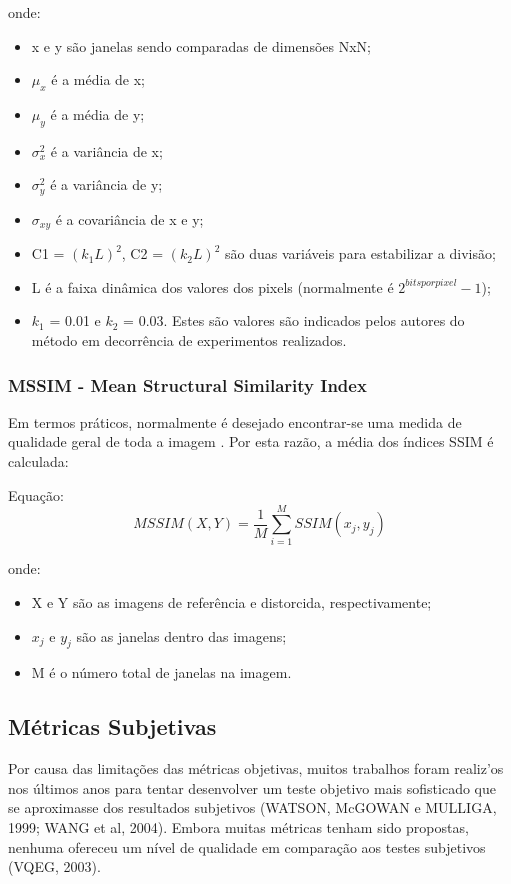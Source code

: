 onde:
\begin{itemize}
	\item x e y são janelas sendo comparadas de dimensões NxN;
	\item \(\mu_{x}\) é a média de x;
    \item \(\mu_{y}\) é  a média de y;
    \item \(\sigma^{2}_{x}\) é a variância de x;
    \item \(\sigma^{2}_{y}\) é a variância de y;
    \item \(\sigma_{xy}\) é a covariância de x e y;
    \item C1 = \((k_{1}L)^{2}\), C2 = \((k_{2}L)^{2}\) são duas variáveis para estabilizar a divisão;
    \item L é a faixa dinâmica dos valores dos pixels (normalmente é \(2^{bits por pixel} - 1\));
    \item \(k_{1}\) = 0.01 e \(k_{2}\) = 0.03. Estes são valores são indicados pelos autores do método \cite{wangbovik2004} em decorrência de experimentos realizados.
\end{itemize}

\subsubsection{MSSIM - Mean Structural Similarity Index}

Em termos práticos, normalmente é desejado encontrar-se uma medida de qualidade geral de toda a imagem \cite{wangbovik2004}. Por esta razão, a média dos índices SSIM é calculada:

Equação: \[MSSIM(X, Y) = \frac{1}{M} \sum_{i=1}^{M} SSIM(x_{j}, y_{j})\]

onde:
\begin{itemize}
	\item X e Y são as imagens de referência e distorcida, respectivamente;
	\item \(x_{j}\) e \(y_{j}\) são as janelas dentro das imagens;
	\item M é o número total de janelas na imagem.
\end{itemize}

\subsection{Métricas Subjetivas}

Por causa das limitações das métricas objetivas, muitos trabalhos foram realiz'os nos últimos anos para tentar desenvolver um teste objetivo mais sofisticado que se aproximasse dos resultados subjetivos (WATSON, McGOWAN e MULLIGA, 1999; WANG et al, 2004). Embora muitas métricas tenham sido propostas, nenhuma ofereceu um nível de qualidade em comparação aos testes subjetivos (VQEG, 2003).

